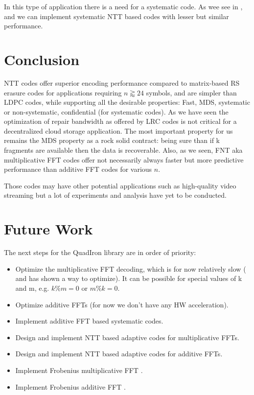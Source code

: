 \documentclass[oneside,9pt]{article}
\begin{document}
In this type of application there is a need for a systematic code. As wee see in \cite{leopard}, \cite{fft_add_chung} and \cite{fnt_lacan} we can implement systematic NTT based codes with lesser but similar performance.

\section{Conclusion}

NTT codes offer superior encoding performance compared to matrix-based RS erasure codes for applications requiring $n \gtrapprox 24$ symbols, and are simpler than LDPC codes, while supporting all the desirable properties: Fast, MDS, systematic or non-systematic, confidential (for systematic codes). As we have seen the optimization of repair bandwidth as offered by LRC codes is not critical for a decentralized cloud storage application. The most important property for us remains the MDS property as a rock solid contract: being sure than if k fragments are available then the data is recoverable. Also, as we seen, FNT aka multiplicative FFT codes offer not necessarily always faster but more predictive performance than additive FFT codes for various $n$. 

Those codes may have other potential applications such as high-quality video streaming but a lot of experiments and analysis have yet to be conducted.

\section{Future Work}
The next steps for the QuadIron library are in order of priority:
\begin{itemize}
\item Optimize the multiplicative FFT decoding, which is for now relatively slow (\cite{fnt_ida} and \cite{gao_decode} has shown a way to optimize). It can be possible for special values of k and m, e.g. $k \% m = 0$ or $m \% k = 0$.
\item Optimize additive FFTs (for now we don't have any HW acceleration).
\item Implement additive FFT based systematic codes.
\item Design and implement NTT based adaptive codes for multiplicative FFTs.
\item Design and implement NTT based adaptive codes for additive FFTs.
\item Implement Frobenius multiplicative FFT \cite{frobenius_fft}.
\item Implement Frobenius additive FFT \cite{frob_additive}.
\end{itemize}
\end{document}

